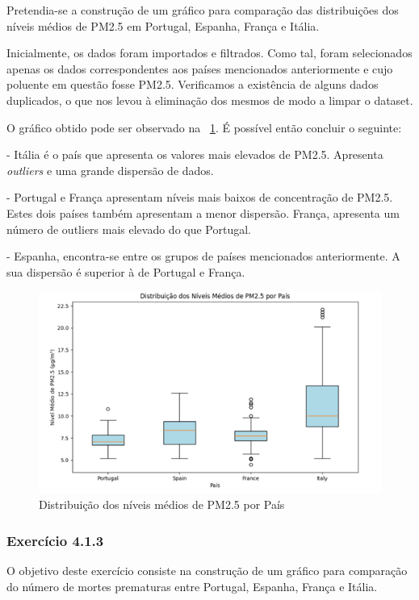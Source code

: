 \documentclass[conference]{IEEEtran}
\begin{document}
Pretendia-se a construção de um gráfico para comparação das distribuições dos níveis médios de PM2.5 em Portugal, Espanha, França e Itália. 

Inicialmente, os dados foram importados e filtrados. Como tal, foram selecionados apenas os dados correspondentes aos países mencionados anteriormente e cujo poluente em questão fosse PM2.5. Verificamos a existência de alguns dados duplicados, o que nos levou à eliminação dos mesmos de modo a limpar o dataset.

O gráfico obtido pode ser observado na \figurename~\ref{fig:niveismediospm25}. É possível então concluir o seguinte:

- Itália é o país que apresenta os valores mais elevados de PM2.5. Apresenta \textit{outliers} e uma grande dispersão de dados.

- Portugal e França apresentam níveis mais baixos de concentração de PM2.5. Estes dois países também apresentam a menor dispersão. França, apresenta um número de outliers mais elevado do que Portugal.

- Espanha, encontra-se entre os grupos de países mencionados anteriormente. A sua dispersão é superior à de Portugal e França.

\begin{figure}
	\centering
	\includegraphics[width=0.9\linewidth]{Niveis_medios_pm25}
	\caption{Distribuição dos níveis médios de PM2.5 por País}
	\label{fig:niveismediospm25}
\end{figure}

\medskip
\subsubsection{\textbf{Exercício 4.1.3}}

O objetivo deste exercício consiste na construção de um gráfico para comparação do número de mortes prematuras entre Portugal, Espanha, França e Itália. 
\end{document}
